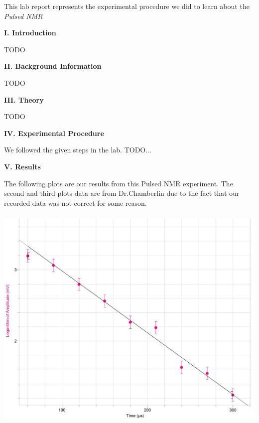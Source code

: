 \documentclass[fleqn]{article}
\begin{document}
  \vspace{10px}

  This lab report represents the experimental procedure we did to learn about the \emph{Pulsed NMR} \textcite{One}

  \vspace{20px}


  \textbf{I. Introduction}

  \vspace{10px}

  TODO 

  \vspace{20px}


  \textbf{II. Background Information}

  \vspace{10px}

  TODO 

  \vspace{20px}


  \textbf{III. Theory}

  \vspace{10px}

  TODO 

  \vspace{20px}


  \textbf{IV. Experimental Procedure}

  \vspace{10px}

  We followed the given steps in the lab. TODO...
  
  \vspace{20px}

  \textbf{V. Results}

  \vspace{10px}

  The following plots are our results from this Pulsed NMR experiment. The second and third plots data are from Dr.Chamberlin due to the fact that our recorded data 
  was not correct for some reason.

  \pagebreak

  \includegraphics[height=11cm, width=15cm]{Fig1.JPG}
  
\end{document}
